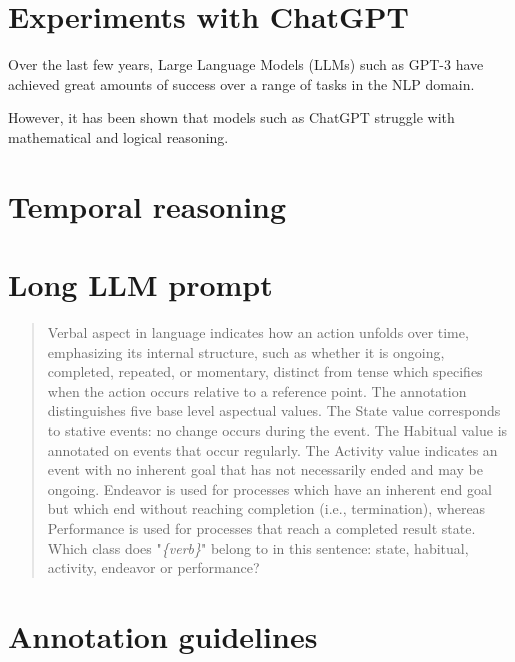\section{Experiments with ChatGPT}
Over the last few years, Large Language Models (LLMs) such as GPT-3 \citep{gpt3} have achieved great amounts of success over a range of tasks in the NLP domain.

However, it has been shown that models such as ChatGPT struggle with mathematical and logical reasoning. 

\section{Temporal reasoning}

\section{Long LLM prompt}
\begin{quotation}
    \label{quote:long_prompt}
    Verbal aspect in language indicates how an action unfolds over time, emphasizing its internal structure, such as whether it is ongoing, completed, repeated, or momentary, distinct from tense which specifies when the action occurs relative to a reference point. The annotation distinguishes five base level aspectual values. The State value corresponds to stative events: no change occurs during the event. The Habitual value is annotated on events that occur regularly. The Activity value indicates an event with no inherent goal that has not necessarily ended and may be ongoing. Endeavor is used for processes which have an inherent end goal but which end without reaching completion (i.e., termination), whereas Performance is used for processes that reach a completed result state. Which class does "\emph{\{verb\}}" belong to in this sentence: state, habitual, activity, endeavor or performance?
\end{quotation}

\section{Annotation guidelines}

\label{App:annguide}

